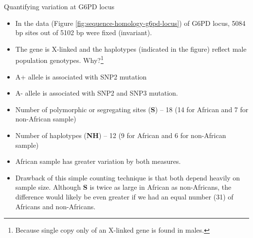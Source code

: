 \documentclass[11pt,dvipsnames,ignorenonframetext,aspectratio=169]{beamer}
\providecommand{\tightlist}{%
  \setlength{\itemsep}{0pt}\setlength{\parskip}{0pt}}
\begin{document}
\begin{frame}{Quantifying variation at G6PD locus}
\protect\hypertarget{quantifying-variation-at-g6pd-locus}{}
\begin{itemize}
\tightlist
\item
  In the data (Figure \ref{fig:sequence-homology-g6pd-locus}) of G6PD
  locus, 5084 bp sites out of 5102 bp were fixed (invariant).
\item
  The gene is X-linked and the haplotypes (indicated in the figure)
  reflect male population genotypes.
  Why?\footnote[frame]{Because single copy only of an X-linked gene is found in males.}
\item
  A+ allele is associated with SNP2 mutation
\item
  A- allele is associated with SNP2 and SNP3 mutation.
\item
  Number of polymorphic or segregating sites (\textbf{S}) -- 18 (14 for
  African and 7 for non-African sample)
\item
  Number of haplotypes (\textbf{NH}) -- 12 (9 for African and 6 for
  non-African sample)
\item
  African sample has greater variation by both measures.
\item
  Drawback of this simple counting technique is that both depend heavily
  on sample size. Although \textbf{S} is twice as large in African as
  non-Africans, the difference would likely be even greater if we had an
  equal number (31) of Africans and non-Africans.
\end{itemize}
\end{frame}
\end{document}
